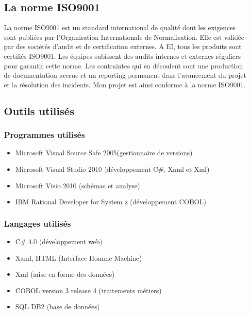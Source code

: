\documentclass[a4paper,french,12pt]{article}
\begin{document}
	\subsection{La norme ISO9001}
	
		La norme ISO9001 est un standard international  de qualité dont les exigences sont publiées par l’Organisation Internationale de Normalisation.
		Elle est validée par des sociétés d’audit et de certification externes. 
		A EI, tous les produits sont certifiés ISO9001. Les équipes subissent des audits internes et externes réguliers pour garantir cette norme. 
		Les contraintes qui en découlent sont une production de documentation accrue et un reporting permanent dans l’avancement du projet et la résolution des incidents.
		Mon projet est ainsi conforme à la norme ISO9001.

	\subsection{Outils utilisés}
	
		\subsubsection{Programmes utilisés}
		
			\begin{itemize}
				\item Microsoft Visual Source Safe 2005(gestionnaire de versions)
				\item Microsoft Visual Studio 2010 (développement C\#, Xaml et Xml)
				\item Microsoft Visio 2010 (schémas et analyse)
				\item IBM Rational Developer for System z (développement COBOL)
			\end{itemize}
		
		\subsubsection{Langages utilisés}
			
			\begin{itemize}
				\item C\# 4.0 (développement web)
				\item Xaml, HTML (Interface Homme-Machine)
				\item Xml (mise en forme des données)
				\item COBOL version 3 release 4 (traitements métiers)
				\item SQL DB2 (base de données)
			\end{itemize}
			
\end{document}
